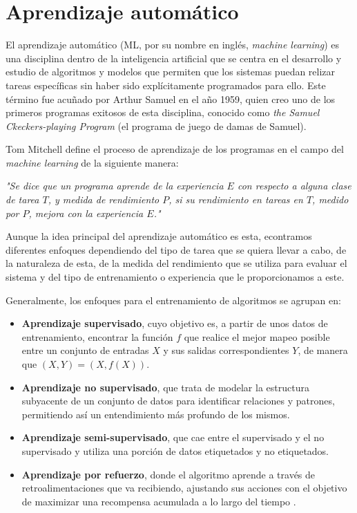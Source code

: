 \documentclass[11pt,spanish,listoffigures,listoftables]{tfgetsinf}
\begin{document}
\section{Aprendizaje automático}

El aprendizaje automático (ML, por su nombre en inglés, \textit{machine learning}) es una disciplina dentro de la inteligencia artificial que se centra en el desarrollo y estudio de algoritmos y modelos que permiten que los sistemas puedan relizar tareas específicas sin haber sido explícitamente programados para ello. Este término fue acuñado por Arthur Samuel en el año 1959, quien creo uno de los primeros programas exitosos de esta disciplina, conocido como \textit{the Samuel Ckeckers-playing Program} \cite{samuelCheckers} (el programa de juego de damas de Samuel).

Tom Mitchell \cite{mitchell1997mcgraw} define el proceso de aprendizaje de los programas en el campo del \textit{machine learning} de la siguiente manera:

\begin{displayquote}
\textit{"Se dice que un programa aprende de la experiencia $E$ con respecto a alguna clase de tarea $T$, y medida de rendimiento $P$, si su rendimiento en tareas en $T$, medido por $P$, mejora con la experiencia $E$."}
\end{displayquote}

Aunque la idea principal del aprendizaje automático es esta, econtramos diferentes enfoques dependiendo del tipo de tarea que se quiera llevar a cabo, de la naturaleza de esta, de la medida del rendimiento que se utiliza para evaluar el sistema y del tipo de entrenamiento o experiencia que le proporcionamos a este.

Generalmente, los enfoques para el entrenamiento de algoritmos se agrupan en:

\begin{itemize}
	\item \textbf{Aprendizaje supervisado}, cuyo objetivo es, a partir de unos datos de entrenamiento, encontrar la función $f$ que realice el mejor mapeo posible entre un conjunto de entradas $X$ y sus salidas correspondientes $Y$, de manera que $(X, Y) = (X, f(X))$.
	\item \textbf{Aprendizaje no supervisado}, que trata de modelar la estructura subyacente de un conjunto de datos para identificar relaciones y patrones, permitiendo así un entendimiento más profundo de los mismos.
	\item \textbf{Aprendizaje semi-supervisado}, que cae entre el supervisado y el no supervisado y utiliza una porción de datos etiquetados y no etiquetados.
	\item \textbf{Aprendizaje por refuerzo}, donde el algoritmo aprende a través de retroalimentaciones que va recibiendo, ajustando sus acciones con el objetivo de maximizar una recompensa acumulada a lo largo del tiempo \cite{mirtaheri2022machine}.

\end{itemize}
\end{document}
